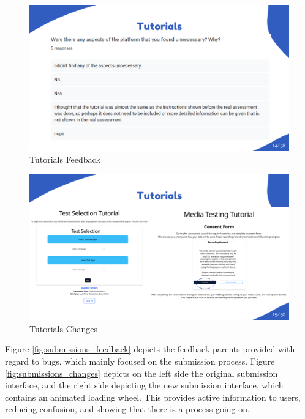 \documentclass{article}
\begin{document}
\begin{figure}[H]
  \centering
  \includegraphics[width=\textwidth]{images/slide14.png}
  \caption{Tutorials Feedback}
  \label{fig:tutorials_feedback}
\end{figure}

\begin{figure}[H]
  \centering
  \includegraphics[width=\textwidth]{images/slide15.png}
  \caption{Tutorials Changes}
  \label{fig:tutorials_changes}
\end{figure}

\newpage

Figure \ref{fig:submissions_feedback} depicts the feedback parents provided with regard to bugs, which mainly focused on the submission process.
Figure \ref{fig:submissions_changes} depicts on the left side the original submission interface, and the right side depicting the new submission interface, which contains
an animated loading wheel. This provides active information to users, reducing confusion, and showing that there is a process going on. 
\end{document}

